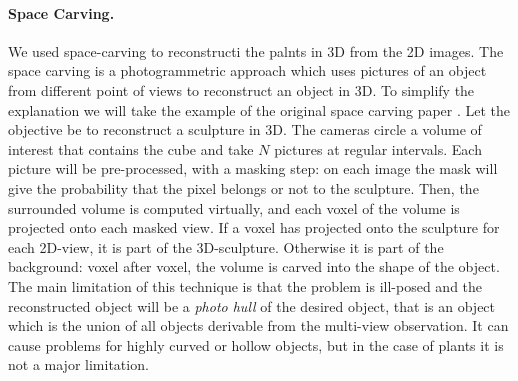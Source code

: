 \paragraph{Space Carving.} We used space-carving to reconstructi
the palnts in 3D from the 2D images. The space carving
\cite{kutulakos_theory_1999} is a photogrammetric approach which uses
pictures of an object from different point of views to reconstruct
an object in 3D. To simplify the explanation we will take the example
of the original space carving paper \cite{kutulakos_theory_1999}. Let
the objective be to reconstruct a sculpture in 3D. The cameras circle
a volume of interest that contains the cube and take $N$ pictures
at regular intervals. Each picture will be pre-processed, with a
masking step: on each image the mask will give the probability that
the pixel belongs or not to the sculpture. Then, the surrounded volume
is computed virtually, and each voxel of the volume is projected onto
each masked view. If a voxel has projected onto the sculpture for each
2D-view, it is part of the 3D-sculpture. Otherwise it is part of the
background: voxel after voxel, the volume is carved into the shape of
the object. The main limitation of this technique is that the problem
is ill-posed and the reconstructed object will be a \emph{photo
hull} \cite{kutulakos_theory_1999} of the desired object, that is an
object which is the union of all objects derivable from the multi-view
observation. It can cause problems for highly curved or hollow objects,
but in the case of plants it is not a major limitation.

